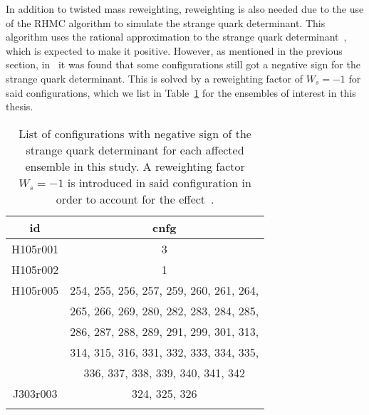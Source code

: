 In addition to twisted mass reweighting, reweighting is also needed due to the use of the RHMC algorithm to simulate the strange quark determinant. This algorithm uses the rational approximation to the strange quark determinant~\citep{Kennedy:1998cu,Clark:2006fx}, which is expected to make it positive. However, as mentioned in the previous section, in~\citep{Mohler:2020txx} it was found that some configurations still got a negative sign for the strange quark determinant. This is solved by a reweighting factor of $W_s=-1$ for said configurations, which we list in Table~\ref{tab:Ws} for the ensembles of interest in this thesis.

\begin{longtable}{c | c}
\toprule
id & cnfg \\
\midrule
H105r001 & 3 \\
H105r002 & 1 \\
H105r005 & 254, 255, 256, 257, 259, 260, 261, 264, \\
         & 265, 266, 269, 280, 282, 283, 284, 285, \\
         & 286, 287, 288, 289, 291, 299, 301, 313,\\
         & 314, 315, 316, 331, 332, 333, 334, 335, \\
         & 336, 337, 338, 339, 340, 341, 342  \\
J303r003 & 324, 325, 326 \\
\bottomrule
\caption{List of configurations with negative sign of the strange quark determinant for each affected ensemble in this study. A reweighting factor $W_s=-1$ is introduced in said configuration in order to account for the effect~\citep{Mohler:2020txx}.}
\label{tab:Ws}
\end{longtable}


